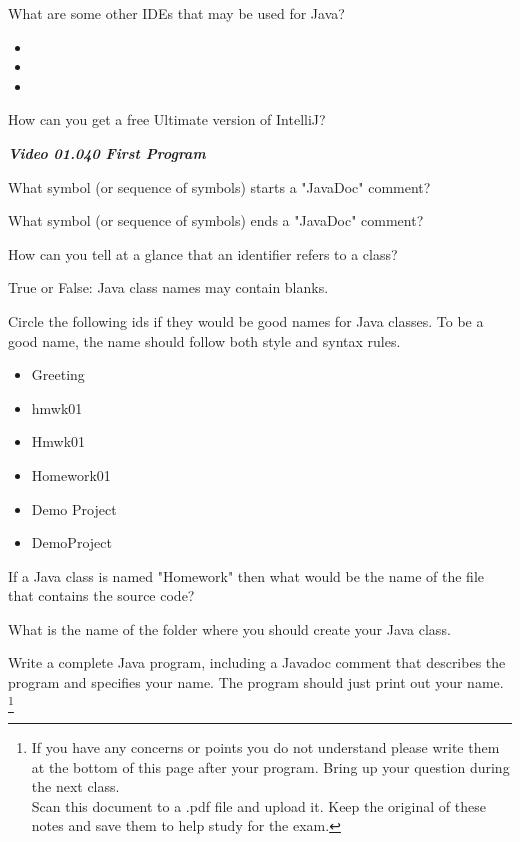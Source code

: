 \documentclass[letterpaper,11pt]{exam}
\newcommand{\videoheading}[1]{\Large\textbf{\textit{#1}}}
\begin{document}
\begin{questions}
\begin{samepage}
    \question What are some other IDEs that may be used for Java?
    \begin{itemize}
        \item 
        \item 
        \item 
    \end{itemize}
\end{samepage}

\question How can you get a free Ultimate version of IntelliJ?



\videoheading{Video 01.040 First Program}

\question What symbol (or sequence of symbols) starts a "JavaDoc" comment?

\question What symbol (or sequence of symbols) ends a "JavaDoc" comment?

\question How can you tell at a glance that an identifier refers to a class?

\question True or False:  Java class names may contain blanks.

\begin{samepage}
    \question Circle the following ids if they would be good names for Java classes.  To be a good name, the name should follow both style and syntax rules.
    \begin{itemize}
        \item Greeting
        \item hmwk01
        \item Hmwk01
        \item Homework01
        \item Demo Project
        \item DemoProject
    \end{itemize}
\end{samepage}

\question If a Java class is named "Homework" then what would be the name of the file that contains the source code? \makebox[4cm]{\hrulefill}

\question What is the name of the folder where you should create your Java class.

\newpage
\question Write a complete Java program, including a Javadoc comment that describes the program and specifies your name.  The program should just print out your name.
\footnote{  If you have any concerns or points you do not understand please write them at the bottom of this page after your program. Bring up your question during the next class. \\Scan this document to a .pdf file and upload it.  Keep the original of these notes and save them to help study for the exam.}



\end{questions}
\end{document}
